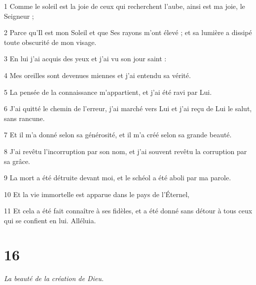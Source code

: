 \par 1 Comme le soleil est la joie de ceux qui recherchent l'aube, ainsi est ma joie, le Seigneur ;
\par 2 Parce qu'Il est mon Soleil et que Ses rayons m'ont élevé ; et sa lumière a dissipé toute obscurité de mon visage.
\par 3 En lui j'ai acquis des yeux et j'ai vu son jour saint :
\par 4 Mes oreilles sont devenues miennes et j'ai entendu sa vérité.
\par 5 La pensée de la connaissance m'appartient, et j'ai été ravi par Lui.
\par 6 J'ai quitté le chemin de l'erreur, j'ai marché vers Lui et j'ai reçu de Lui le salut, sans rancune.
\par 7 Et il m'a donné selon sa générosité, et il m'a créé selon sa grande beauté.
\par 8 J'ai revêtu l'incorruption par son nom, et j'ai souvent revêtu la corruption par sa grâce.
\par 9 La mort a été détruite devant moi, et le schéol a été aboli par ma parole.
\par 10 Et la vie immortelle est apparue dans le pays de l'Éternel,
\par 11 Et cela a été fait connaître à ses fidèles, et a été donné sans détour à tous ceux qui se confient en lui. Alléluia.

\chapter{16}

\par \textit{La beauté de la création de Dieu.}

